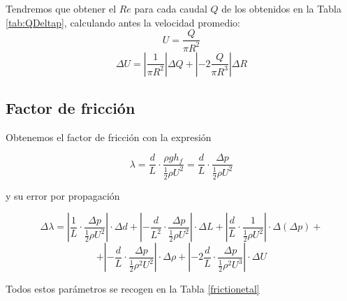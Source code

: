 \documentclass[a4paper,12pt,spanish]{article}
\begin{document}

	
	Tendremos que obtener el $Re$ para cada caudal $Q$ de los obtenidos en la Tabla \ref{tab:QDeltap}, calculando antes la velocidad promedio:
	\[ U = \frac{Q}{\pi R^2}
	\]
	\[ \Delta U = \left| \frac{1}{\pi R^2}
	\right|\Delta Q + \left| -2\frac{Q}{\pi R^3}
	\right| \Delta R
	\]
	
	\subsection*{Factor de fricción}
	
	Obtenemos el factor de fricción con la expresión
	
	\[\lambda = \frac{d}{L} \cdot \frac{\rho g h_f}{\frac{1}{2} \rho U^2} = \frac{d}{L} \cdot \frac{\mathit{\Delta}p}{\frac{1}{2} \rho U^2}\]
	
	y su error por propagación
	
	\[ \Delta \lambda =  \left|   \frac{1}{L} \cdot \frac{\mathit{\Delta}p}{\frac{1}{2} \rho U^2} 
	 \right| \cdot \Delta d +  \left|   -\frac{d}{L^2} \cdot \frac{\mathit{\Delta}p}{\frac{1}{2} \rho U^2} 
	 \right| \cdot \Delta L + \left|   \frac{d}{L} \cdot \frac{1}{\frac{1}{2} \rho U^2} 
	 \right| \cdot \Delta (\mathit{\Delta}p) +
	\]
	\[ + \left|  - \frac{d}{L} \cdot \frac{ \mathit{\Delta}p}{\frac{1}{2} \rho^2 U^2} 
	\right| \cdot \Delta \rho  + \left|  -2 \frac{d}{L} \cdot \frac{ \mathit{\Delta}p}{\frac{1}{2} \rho^2 U^3} 
	\right| \cdot \Delta U
	\]
	
	\vspace{\baselineskip}
	\vspace{\baselineskip}
	
	Todos estos parámetros se recogen en la Tabla \ref{frictionetal}
	
\end{document}
